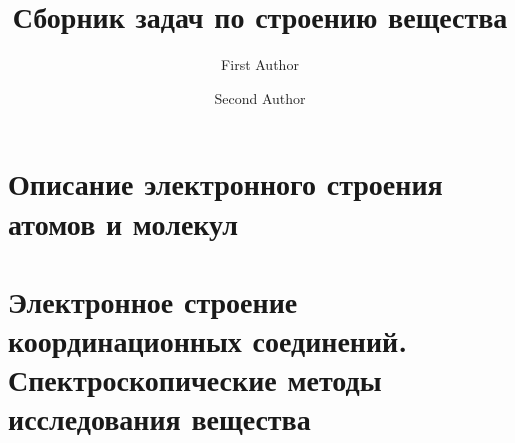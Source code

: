 \documentclass[openright,a5paper,twoside]{book}
\title{Сборник задач по строению вещества}
\author{First Author \and Second Author}
\begin{document}
\frontmatter




%

%

%



%

\footnotesize
\tableofcontents

\mainmatter

\chapter[Описание электронного строения  атомов и молекул]{\texorpdfstring{Описание электронного строения\\атомов и молекул}{Описание электронного строения  атомов и молекул}}
\thispagestyle{empty}













\chapter[Электронное строение координационных соединений.\\Спектроскопические методы исследования вещества]{\texorpdfstring{Электронное строение\\координационных соединений.\\Спектроскопические методы исследования вещества}{Электронное строение координационных соединений. Спектроскопические методы исследования вещества}}
\thispagestyle{empty}
\end{document}
